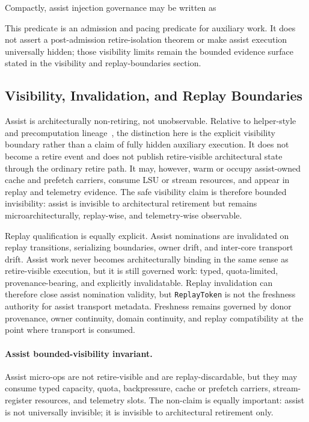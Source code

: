 \documentclass[twocolumn]{article}
\begin{document}
Compactly, assist injection governance may be written as

This predicate is an admission and pacing predicate for auxiliary work. It does not assert a post-admission retire-isolation theorem or make assist execution universally hidden; those visibility limits remain the bounded evidence surface stated in the visibility and replay-boundaries section.


\subsection{Visibility, Invalidation, and Replay Boundaries}

Assist is architecturally non-retiring, not unobservable. Relative to helper-style and precomputation lineage~\cite{mutlu2003runahead,collins2001speculative,chappell1999ssmt}, the distinction here is the explicit visibility boundary rather than a claim of fully hidden auxiliary execution. It does not become a retire event and does not publish retire-visible architectural state through the ordinary retire path. It may, however, warm or occupy assist-owned cache and prefetch carriers, consume LSU or stream resources, and appear in replay and telemetry evidence. The safe visibility claim is therefore bounded invisibility: assist is invisible to architectural retirement but remains microarchitecturally, replay-wise, and telemetry-wise observable.



Replay qualification is equally explicit. Assist nominations are invalidated on replay transitions, serializing boundaries, owner drift, and inter-core transport drift. Assist work never becomes architecturally binding in the same sense as retire-visible execution, but it is still governed work: typed, quota-limited, provenance-bearing, and explicitly invalidatable. Replay invalidation can therefore close assist nomination validity, but \texttt{ReplayToken} is not the freshness authority for assist transport metadata. Freshness remains governed by donor provenance, owner continuity, domain continuity, and replay compatibility at the point where transport is consumed.

\paragraph{Assist bounded-visibility invariant.}
Assist micro-ops are not retire-visible and are replay-discardable, but they may consume typed capacity, quota, backpressure, cache or prefetch carriers, stream-register resources, and telemetry slots. The non-claim is equally important: assist is not universally invisible; it is invisible to architectural retirement only.
\end{document}

